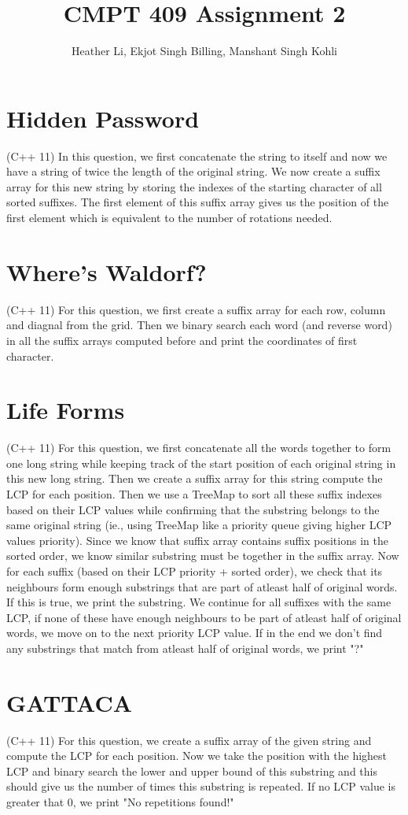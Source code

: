 \documentclass{article}
\title{CMPT 409 Assignment 2}
\author{Heather Li, Ekjot Singh Billing, Manshant Singh Kohli}
\begin{document}
\maketitle

\section{Hidden Password}
(C++ 11) In this question, we first concatenate the string to itself and now we have a string of twice the length of the original string. We now create a suffix array for this new string by storing the indexes of the starting character of all sorted suffixes. The first element of this suffix array gives us the position of the first element which is equivalent to the number of rotations needed.

\section{Where's Waldorf?}
(C++ 11) For this question, we first create a suffix array for each row, column and diagnal from the grid. Then we binary search each word (and reverse word) in all the suffix arrays computed before and print the coordinates of first character.

\section{Life Forms}
(C++ 11) For this question, we first concatenate all the words together to form one long string while keeping track of the start position of each original string in this new long string. Then we create a suffix array for this string compute the LCP for each position. Then we use a TreeMap to sort all these suffix indexes based on their LCP values while confirming that the substring belongs to the same original string (ie., using TreeMap like a priority queue giving higher LCP values priority). Since we know that suffix array contains suffix positions in the sorted order, we know similar substring must be together in the suffix array. Now for each suffix (based on their LCP priority + sorted order), we check that its neighbours form enough substrings that are part of atleast half of original words. If this is true, we print the substring. We continue for all suffixes with the same LCP, if none of these have enough neighbours to be part of atleast half of original words, we move on to the next priority LCP value. If in the end we don't find any substrings that match from atleast half of original words, we print "?"


\section{GATTACA}
(C++ 11) For this question, we create a suffix array of the given string and compute the LCP for each position. Now we take the position with the highest LCP and binary search the lower and upper bound of this substring and this should give us the number of times this substring is repeated. If no LCP value is greater that 0, we print "No repetitions found!"
\end{document}
